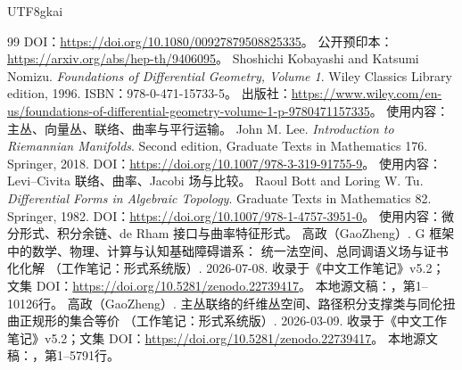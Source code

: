 \documentclass[12pt,a4paper,openany,notitlepage]{report}
\theoremstyle{plain}
\theoremstyle{definition}
\theoremstyle{remark}
\begin{document}
\begin{CJK*}{UTF8}{gkai}
\begin{thebibliography}{99}
\newblock DOI：\url{https://doi.org/10.1080/00927879508825335}。
\newblock 公开预印本：\url{https://arxiv.org/abs/hep-th/9406095}。
Shoshichi Kobayashi and Katsumi Nomizu.
\emph{Foundations of Differential Geometry, Volume 1}.
Wiley Classics Library edition, 1996.
\newblock ISBN：978-0-471-15733-5。
\newblock 出版社：\url{https://www.wiley.com/en-us/foundations-of-differential-geometry-volume-1-p-9780471157335}。
\newblock 使用内容：主丛、向量丛、联络、曲率与平行运输。
John M. Lee. \emph{Introduction to Riemannian Manifolds}.
Second edition, Graduate Texts in Mathematics 176. Springer, 2018.
\newblock DOI：\url{https://doi.org/10.1007/978-3-319-91755-9}。
\newblock 使用内容：Levi--Civita 联络、曲率、Jacobi 场与比较。
Raoul Bott and Loring W. Tu. \emph{Differential Forms in Algebraic Topology}.
Graduate Texts in Mathematics 82. Springer, 1982.
\newblock DOI：\url{https://doi.org/10.1007/978-1-4757-3951-0}。
\newblock 使用内容：微分形式、积分余链、de Rham 接口与曲率特征形式。
高政（GaoZheng）. G 框架中的数学、物理、计算与认知基础障碍谱系： 统一法空间、总同调语义场与证书化化解 （工作笔记：形式系统版）. 2026-07-08.
\newblock 收录于《中文工作笔记》v5.2；文集 DOI：\url{https://doi.org/10.5281/zenodo.22739417}。
\newblock 本地源文稿：，第1--10126行。
高政（GaoZheng）. 主丛联络的纤维丛空间、路径积分支撑类与同伦扭曲正规形的集合等价 （工作笔记：形式系统版）. 2026-03-09.
\newblock 收录于《中文工作笔记》v5.2；文集 DOI：\url{https://doi.org/10.5281/zenodo.22739417}。
\newblock 本地源文稿：，第1--5791行。
\end{thebibliography}
\clearpage
\end{CJK*}
\end{document}
